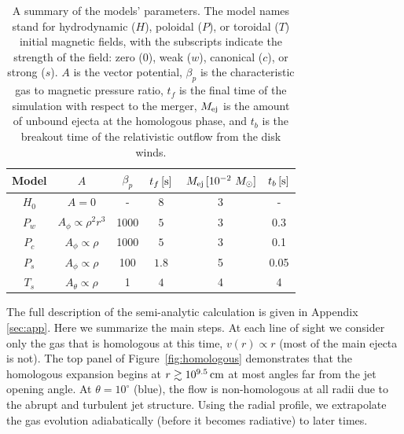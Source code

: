 \documentclass[twocolumn,dvipsnames]{aastex62}
\newcommand{\mej}{\,{M_{\rm ej}}}
\newcommand{\msun}{\,{M_{\odot}}}
\begin{document}
	\begin{table}
		\setlength{\tabcolsep}{6.2pt}
		\centering
		\renewcommand{\arraystretch}{1.2}
		\begin{tabular}{| c | c c c | c c | }
			
                \hline
			Model & $ A $ & $ \beta_p $ & $ t_f\,[{\rm s}] $ & $ \mej\,[10^{-2}\,\msun] $ & $ t_b\,[{\rm s}] $
			\\	\hline
			$ H_0 $ & $ A = 0 $ & - & $ 8 $ & 3 & - \\ %
			$ P_w $ & $ A_\phi \propto \rho^2r^3 $ & 1000 & $ 5 $ & 3 & 0.3\\ %
			$ P_c $ & $ A_\phi \propto \rho $ & 1000 & $ 5 $ & 3 & 0.1 \\   %
			$ P_s $ & $ A_\phi \propto \rho $ & 100 & $ 1.8 $ & 5 & 0.05\\   %
			$ T_s $ & $ A_\theta \propto \rho $ & 1 & $ 4 $ & 4 & 4 \\ %
                \hline
		\end{tabular}
		
		\caption{
			A summary of the models' parameters. The model names stand for hydrodynamic ($H$), poloidal ($P$), or toroidal ($T$) initial magnetic fields, with the subscripts indicate the strength of the field: zero ($0$), weak ($w$), canonical ($c$), or strong ($s$). $ A $ is the vector potential, $ \beta_p $ is the characteristic gas to magnetic pressure ratio, $ t_f $ is the final time of the simulation with respect to the merger, $ M_{\rm ej} $ is the amount of unbound ejecta at the homologous phase, and $ t_b $ is the breakout time of the relativistic outflow from the disk winds.
    		}
    		\label{tab:models}
	\end{table}

The full description of the semi-analytic calculation is given in Appendix \ref{sec:app}. Here we summarize the main steps. At each line of sight we consider only the gas that is homologous at this time, $ v(r) \propto r $ (most of the main ejecta is not). The top panel of Figure~\ref{fig:homologous} demonstrates that the homologous expansion begins at $ r \gtrsim 10^{9.5}\,{\rm cm} $ at most angles far from the jet opening angle. At $ \theta = 10^\circ $ (blue), the flow is non-homologous at all radii due to the abrupt and turbulent jet structure. Using the radial profile, we extrapolate the gas evolution adiabatically (before it becomes radiative) to later times.
\end{document}
